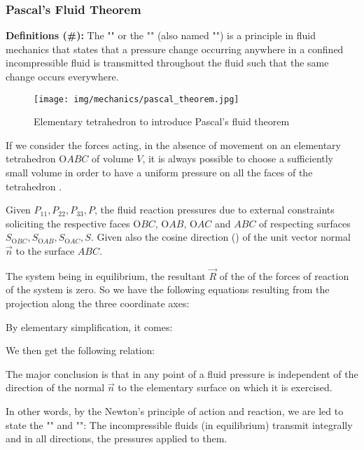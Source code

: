 	\pagebreak
	\subsubsection{Pascal's Fluid Theorem}
	 \textbf{Definitions (\#\mydef):} The "" or the "" (also named "") is a principle in fluid mechanics that states that a pressure change occurring anywhere in a confined incompressible fluid is transmitted throughout the fluid such that the same change occurs everywhere.
	
	\begin{figure}[H]
		\centering
		\texttt{[image: img/mechanics/pascal\_theorem.jpg]}
		\caption[]{Elementary tetrahedron to introduce Pascal's fluid theorem}
	\end{figure}
	If we consider the forces acting, in the absence of movement on an elementary tetrahedron O$ABC$ of volume $V$, it is always possible to choose a sufficiently small volume in order to have a uniform pressure on all the faces of the tetrahedron .

	Given $P_{11},P_{22},P_{33},P$, the fluid reaction pressures due to external constraints soliciting the respective faces O$BC$, O$AB$, O$AC$ and $ABC$ of respecting surfaces $S_{\text{O}BC},S_{\text{O}AB},S_{\text{O}AC},S$. Given also the cosine direction () of the unit vector normal $\vec{n}$ to the surface $ABC$.

	The system being in equilibrium, the resultant $\vec{R}$ of the of the forces of reaction of the system is zero. So we have the following equations resulting from the projection along the three coordinate axes:
	
	By elementary simplification, it comes:
	
	We then get the following relation:
	
	The major conclusion is that in any point of a fluid pressure is independent of the direction of the normal $\vec{n}$ to the elementary surface on which it is exercised.

	In other words, by the Newton's principle of action and reaction, we are led to state the "" and "": The incompressible fluids (in equilibrium) transmit integrally and in all directions, the pressures applied to them.
	
